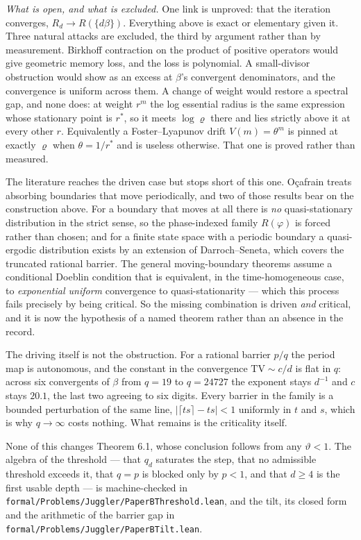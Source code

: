 \documentclass[11pt,a4paper]{article}
\begin{document}
\emph{What is open, and what is excluded.} One link is unproved: that
the iteration converges, \(R_d\to R(\{d\beta\})\). Everything above is
exact or elementary given it. Three natural attacks are excluded, the
third by argument rather than by measurement. Birkhoff contraction on
the product of positive operators would give geometric memory loss, and
the loss is polynomial. A small-divisor obstruction would show as an
excess at \(\beta\)'s convergent denominators, and the convergence is
uniform across them. A change of weight would restore a spectral gap,
and none does: at weight \(r^m\) the log essential radius is the same
expression whose stationary point is \(r^{*}\), so it meets
\(\log\varrho\) there and lies strictly above it at every other \(r\).
Equivalently a Foster--Lyapunov drift \(V(m)=\theta^{m}\) is pinned at
exactly \(\varrho\) when \(\theta=1/r^{*}\) and is useless otherwise.
That one is proved rather than measured.

The literature reaches the driven case but stops short of this one.
O\c{c}afrain treats absorbing boundaries that move periodically, and two
of those results bear on the construction above. For a boundary that
moves at all there is \emph{no} quasi-stationary distribution in the
strict sense, so the phase-indexed family \(R(\varphi)\) is forced
rather than chosen; and for a finite state space with a periodic
boundary a quasi-ergodic distribution exists by an extension of
Darroch--Seneta, which covers the truncated rational barrier. The
general moving-boundary theorems assume a conditional Doeblin condition
that is equivalent, in the time-homogeneous case, to \emph{exponential
uniform} convergence to quasi-stationarity --- which this process fails
precisely by being critical. So the missing combination is driven
\emph{and} critical, and it is now the hypothesis of a named theorem
rather than an absence in the record.

The driving itself is not the obstruction. For a rational barrier
\(p/q\) the period map is autonomous, and the constant in the
convergence \(\mathrm{TV}\sim c/d\) is flat in \(q\): across six
convergents of \(\beta\) from \(q=19\) to \(q=24727\) the exponent stays
\(d^{-1}\) and \(c\) stays \(20.1\), the last two agreeing to six
digits. Every barrier in the family is a bounded perturbation of the
same line, \(\lvert\lceil ts\rceil-ts\rvert<1\) uniformly in \(t\) and
\(s\), which is why \(q\to\infty\) costs nothing. What remains is the
criticality itself.

None of this changes Theorem 6.1, whose conclusion follows from any
\(\vartheta<1\). The algebra of the threshold --- that \(q_d\) saturates
the step, that no admissible threshold exceeds it, that \(q=p\) is
blocked only by \(p<1\), and that \(d\ge4\) is the first usable depth
--- is machine-checked in
\texttt{formal/Problems/Juggler/PaperBThreshold.lean}, and the tilt, its
closed form and the arithmetic of the barrier gap in
\texttt{formal/Problems/Juggler/PaperBTilt.lean}.
\end{document}
